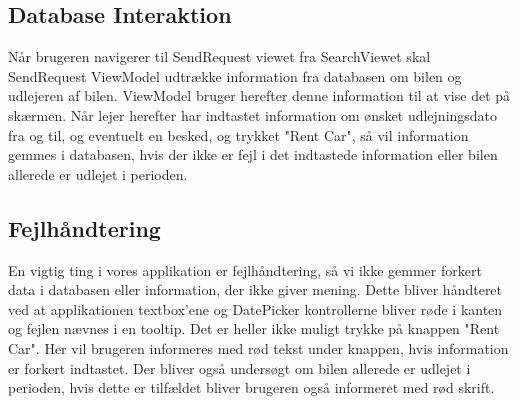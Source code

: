 \documentclass[SoftwareDesign/SoftwareDesign_main.tex]{subfiles}
\begin{document}
\subsection{Database Interaktion}
Når brugeren navigerer til SendRequest viewet fra SearchViewet skal SendRequest ViewModel udtrække information fra databasen om bilen og udlejeren af bilen. ViewModel bruger herefter denne information til at vise det på skærmen. Når lejer herefter har indtastet information om ønsket udlejningsdato fra og til, og eventuelt en besked, og trykket "Rent Car", så vil information gemmes i databasen, hvis der ikke er fejl i det indtastede information eller bilen allerede er udlejet i perioden. 
\subsection{Fejlhåndtering}
En vigtig ting i vores applikation er fejlhåndtering, så vi ikke gemmer forkert data i databasen eller information, der ikke giver mening. Dette bliver håndteret ved at applikationen textbox'ene og DatePicker kontrollerne bliver røde i kanten og fejlen nævnes i en tooltip. Det er heller ikke muligt trykke på knappen "Rent Car". Her vil brugeren informeres med rød tekst under knappen, hvis information er forkert indtastet. Der bliver også undersøgt om bilen allerede er udlejet i perioden, hvis dette er tilfældet bliver brugeren også informeret med rød skrift.
\end{document}
